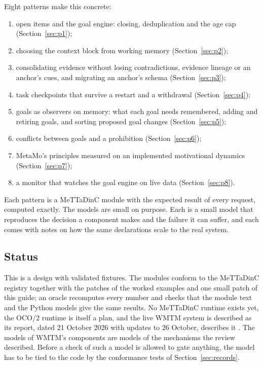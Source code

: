 \documentclass[11pt]{article}
\theoremstyle{definition}
\theoremstyle{plain}
\begin{document}
Eight patterns make this concrete:
\begin{enumerate}
\item open items and the goal engine: closing, deduplication and the age cap
  (Section~\ref{sec:p1});
\item choosing the context block from working memory (Section~\ref{sec:p2});
\item consolidating evidence without losing contradictions, evidence lineage or an anchor's cues,
  and migrating an anchor's schema (Section~\ref{sec:p3});
\item task checkpoints that survive a restart and a withdrawal (Section~\ref{sec:p4});
\item goals as observers on memory: what each goal needs remembered, adding and retiring goals,
  and sorting proposed goal changes (Section~\ref{sec:p5});
\item conflicts between goals and a prohibition (Section~\ref{sec:p6});
\item MetaMo's principles measured on an implemented motivational dynamics
  (Section~\ref{sec:p7});
\item a monitor that watches the goal engine on live data (Section~\ref{sec:p8}).
\end{enumerate}
Each pattern is a MeTTaDinC module with the expected result of every request, computed exactly.
The models are small on purpose. Each is a small model that reproduces the decision a component
makes and the failure it can suffer, and each comes with notes on how the same
declarations scale to the real system.

\subsection{Status}

This is a design with validated fixtures. The modules conform to the MeTTaDinC registry together
with the patches of the worked examples and one small patch of this guide; an oracle recomputes
every number and checks that the module text and the Python models give the same results. No
MeTTaDinC runtime exists yet, the OCO/2 runtime is itself a plan, and the live WMTM system is
described as its report, dated 21 October 2026 with updates to 26 October, describes it
\cite{wmtm}. The models of WMTM's components are
models of the mechanisms the review described. Before a check of such a model is allowed to gate
anything, the model has to be tied to the code by the conformance tests of
Section~\ref{sec:records}.
\end{document}
